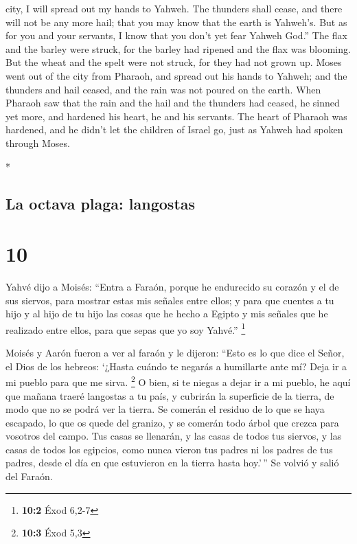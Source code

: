 \begin{paracol}{2}
\begin{otherlanguage}{english}
city, I will spread out my hands to Yahweh. The thunders shall cease,
and there will not be any more hail; that you may know that the earth is
Yahweh's.  But as for you and your servants, I know that
you don't yet fear Yahweh God.''  The flax and the barley
were struck, for the barley had ripened and the flax was blooming.
 But the wheat and the spelt were not struck, for they
had not grown up.  Moses went out of the city from
Pharaoh, and spread out his hands to Yahweh; and the thunders and hail
ceased, and the rain was not poured on the earth.  When
Pharaoh saw that the rain and the hail and the thunders had ceased, he
sinned yet more, and hardened his heart, he and his servants.
 The heart of Pharaoh was hardened, and he didn't let the
children of Israel go, just as Yahweh had spoken through Moses.

\end{otherlanguage}

\switchcolumn[0]*

\hypertarget{la-octava-plaga-langostas}{%
\subsection{La octava plaga:
langostas}\label{la-octava-plaga-langostas}}

\hypertarget{section-18}{%
\section{10}\label{section-18}}

 Yahvé dijo a Moisés: ``Entra a Faraón, porque he
endurecido su corazón y el de sus siervos, para mostrar estas mis
señales entre ellos;  y para que cuentes a tu hijo y al
hijo de tu hijo las cosas que he hecho a Egipto y mis señales que he
realizado entre ellos, para que sepas que yo soy Yahvé.'' \footnote{\textbf{10:2}
  Éxod 6,2-7}

 Moisés y Aarón fueron a ver al faraón y le dijeron:
``Esto es lo que dice el Señor, el Dios de los hebreos: `¿Hasta cuándo
te negarás a humillarte ante mí? Deja ir a mi pueblo para que me sirva.
\footnote{\textbf{10:3} Éxod 5,3}  O bien, si te niegas a
dejar ir a mi pueblo, he aquí que mañana traeré langostas a tu país,
 y cubrirán la superficie de la tierra, de modo que no se
podrá ver la tierra. Se comerán el residuo de lo que se haya escapado,
lo que os quede del granizo, y se comerán todo árbol que crezca para
vosotros del campo.  Tus casas se llenarán, y las casas de
todos tus siervos, y las casas de todos los egipcios, como nunca vieron
tus padres ni los padres de tus padres, desde el día en que estuvieron
en la tierra hasta hoy.'\,'' Se volvió y salió del Faraón.


\end{paracol}
